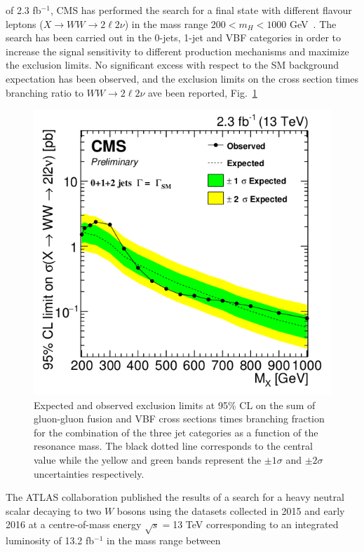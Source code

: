 of 2.3 fb$^{-1}$, CMS has  performed the search for a final state with different flavour leptons ($X \to WW \to 2\ell 2\nu$) in the mass range  200$< m_H< 1000$ GeV~\cite{CMS-PAS-HIG-16-023}. The search has been carried out in the 0-jets, 1-jet and VBF categories in order to increase the signal sensitivity to different production mechanisms and maximize the exclusion limits. 
No significant excess with respect to the SM background expectation has been observed, and
the exclusion limits on the cross section times branching ratio to  $ WW \to 2\ell 2\nu$ ave been reported, Fig.~\ref{lim_2015}
\begin{figure}
\centering
\includegraphics[scale= 0.4]{../Cap1/lim_2015}
\caption{Expected and observed exclusion limits at 95\% CL on the sum of gluon-gluon fusion and VBF cross
sections times branching fraction for the combination of the three jet categories as a function
of the resonance mass. The black dotted line corresponds to the central value while the yellow
and green bands represent the $\pm 1\sigma$ and $\pm 2\sigma$  uncertainties respectively. }
\label{lim_2015}
\end{figure}
The ATLAS collaboration published the results of a search for a heavy neutral scalar decaying to two $W$ bosons using the datasets collected in 2015 and early
2016 at a centre-of-mass energy $\sqrt{s}=$13 TeV corresponding to an integrated luminosity of 13.2 fb$^{-1}$ in the mass range between
